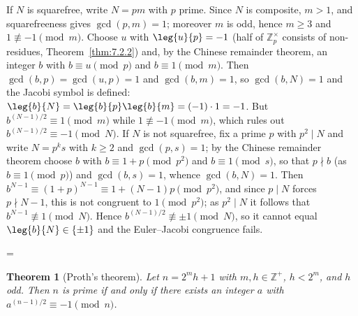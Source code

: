 \documentclass[11pt]{article}
\makeatletter
\theoremstyle{ntstyle}
\newtheorem{theorem}{Theorem}[subsection]
\let\nt@closedisplay\]
\def\nt@guardedclose{\@ifnextchar\par{\nt@closeafterpar}{\@ifnextchar\end{\postdisplaypenalty\@M\nt@closedisplay}{\nt@closedisplay}}}
\def\nt@closeafterpar\par{\@ifnextchar\par{\nt@closeafterpar}{\@ifnextchar\end{\postdisplaypenalty\@M\nt@closedisplay\par}{\nt@closedisplay\par}}}
\renewenvironment{proof}[1][\proofname]{\par
  \pushQED{\qed}\normalfont\topsep\medskipamount\edef\nt@afterproof{\@endparpenalty=\the\@endparpenalty\relax}\@beginparpenalty\@M\@endparpenalty\@M\let\]\nt@guardedclose\trivlist\item[]\textit{#1\@addpunct{.}} \ignorespaces}{\ifvmode\addpenalty\@M\fi\popQED\nt@afterproof\endtrivlist\@endpefalse}
\newcommand{\ZmodUnits}[1]{\mathbb{Z}_{#1}^{\times}}
\makeatother
\begin{document}
\begin{proof} If $N$ is squarefree, write $N=pm$ with $p$
	prime. Since $N$ is composite, $m>1$, and squarefreeness gives $\gcd(p,
		m)=1$; moreover $m$ is odd, hence $m\ge3$ and $1\not\equiv-1\pmod{m}$.
	Choose $u$ with $\leg{u}{p}=-1$ (half of $\ZmodUnits{p}$ consists
	of non-residues, Theorem~\ref{thm:7.2.2}) and, by the Chinese remainder theorem, an
	integer $b$ with $b\equiv u\pmod{p}$ and $b\equiv1\pmod{m}$. Then
	$\gcd(b, p)=\gcd(u, p)=1$ and $\gcd(b, m)=1$, so $\gcd(b, N)=1$ and the
	Jacobi symbol is defined:
	$\leg{b}{N}=\leg{b}{p}\leg{b}{m}=(-1)\cdot1=-1$. But
	$b^{(N-1)/2}\equiv1\pmod{m}$ while $1\not\equiv-1\pmod{m}$, which rules
	out $b^{(N-1)/2}\equiv-1\pmod{N}$.
	  If $N$ is not squarefree, fix a prime $p$ with $p^{2}\mid N$ and write $N=p^{k}s$ with $k\ge2$ and $\gcd(p, s)=1$; by the Chinese remainder theorem choose $b$ with $b\equiv1+p\pmod{p^{2}}$ and $b\equiv1\pmod{s}$, so that $p\nmid b$ (as $b\equiv1\pmod{p}$) and $\gcd(b, s)=1$, whence $\gcd(b, N)=1$.
	  Then $b^{N-1}\equiv(1+p)^{N-1}\equiv1+(N-1)p\pmod{p^{2}}$, and since $p\mid N$ forces $p\nmid N-1$, this is not congruent to $1\pmod{p^{2}}$; as $p^{2}\mid N$ it follows that $b^{N-1}\not\equiv1\pmod{N}$.
	  Hence $b^{(N-1)/2}\not\equiv\pm1\pmod{N}$, so it cannot equal $\leg{b}{N}\in\{\pm1\}$ and the Euler--Jacobi congruence fails.

\end{proof}
\begin{theorem}[Proth's theorem]\label{thm:9.1.6} Let $n=2^{m}h+1$
	with $m,h\in\mathbb{Z}^+$, $h<2^{m}$, and $h$ odd. Then $n$ is prime if and only if
	there exists an integer $a$ with $a^{(n-1)/2}\equiv-1\pmod{n}$.

\end{theorem}
\end{document}
